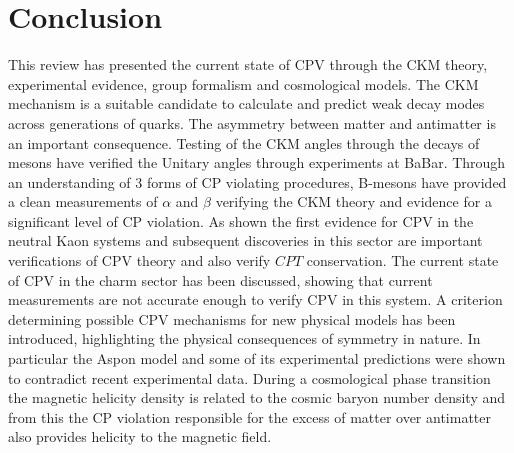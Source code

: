 \section{Conclusion}

This review has presented the current state of CPV through the CKM theory, experimental evidence, group formalism and cosmological models. 
The CKM mechanism is a suitable candidate to calculate and predict weak decay modes across generations of quarks. The asymmetry between matter and antimatter is an important consequence. Testing of the CKM angles through the decays of mesons have verified the Unitary angles through experiments at BaBar. Through an understanding of 3 forms of CP violating procedures, B-mesons have provided a clean measurements of $\alpha$ and $\beta$  verifying the CKM theory and evidence for a significant level of CP violation.
As shown the first evidence for CPV in the neutral Kaon systems and subsequent discoveries in this sector are important verifications of CPV theory and also verify $CPT$ conservation. The current state of CPV in the charm sector has been discussed, showing that current measurements are not accurate enough to verify CPV in this system. 
A criterion determining possible CPV mechanisms for new physical models has been introduced, highlighting the physical consequences of symmetry in nature. In particular the Aspon model and some of its experimental predictions were shown to contradict recent experimental data.
During a cosmological phase transition the magnetic helicity density is related to the cosmic baryon number density and from this the CP violation responsible for the excess of matter over antimatter also provides helicity to the magnetic field.